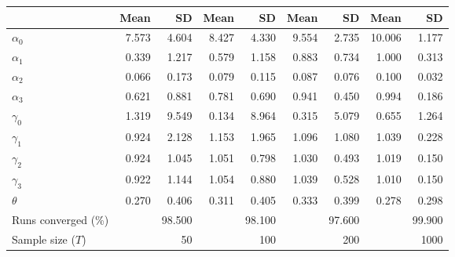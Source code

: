 
\begin{tabular}[t]{lrrrrrrrr}
\toprule
  & Mean & SD & Mean  & SD  & Mean   & SD   & Mean    & SD   \\
\midrule
$\alpha_{0}$ & 7.573 & 4.604 & 8.427 & 4.330 & 9.554 & 2.735 & 10.006 & 1.177\\
$\alpha_{1}$ & 0.339 & 1.217 & 0.579 & 1.158 & 0.883 & 0.734 & 1.000 & 0.313\\
$\alpha_{2}$ & 0.066 & 0.173 & 0.079 & 0.115 & 0.087 & 0.076 & 0.100 & 0.032\\
$\alpha_{3}$ & 0.621 & 0.881 & 0.781 & 0.690 & 0.941 & 0.450 & 0.994 & 0.186\\
$\gamma_{0}$ & 1.319 & 9.549 & 0.134 & 8.964 & 0.315 & 5.079 & 0.655 & 1.264\\
$\gamma_{1}$ & 0.924 & 2.128 & 1.153 & 1.965 & 1.096 & 1.080 & 1.039 & 0.228\\
$\gamma_{2}$ & 0.924 & 1.045 & 1.051 & 0.798 & 1.030 & 0.493 & 1.019 & 0.150\\
$\gamma_{3}$ & 0.922 & 1.144 & 1.054 & 0.880 & 1.039 & 0.528 & 1.010 & 0.150\\
$\theta$ & 0.270 & 0.406 & 0.311 & 0.405 & 0.333 & 0.399 & 0.278 & 0.298\\
Runs converged (\%) &  & 98.500 &  & 98.100 &  & 97.600 &  & 99.900\\
Sample size ($T$) &  & 50 &  & 100 &  & 200 &  & 1000\\
\bottomrule
\end{tabular}
